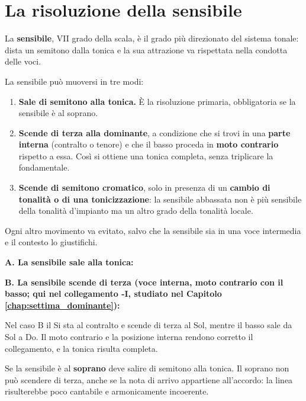 \section{La risoluzione della sensibile}
\label{sec:risoluzione_sensibile}

La \textbf{sensibile}, VII grado della scala, è il grado più direzionato del sistema tonale: dista un semitono dalla tonica e la sua attrazione va rispettata nella condotta delle voci.

\begin{regola}
	\label{reg:tre_movimenti_sensibile}
	La sensibile può muoversi in tre modi:
	\begin{enumerate}
		\item \textbf{Sale di semitono alla tonica.} È la risoluzione primaria, obbligatoria se la sensibile è al soprano.
		\item \textbf{Scende di terza alla dominante}, a condizione che si trovi in una \textbf{parte interna} (contralto o tenore) e che il basso proceda in \textbf{moto contrario} rispetto a essa. Così si ottiene una tonica completa, senza triplicare la fondamentale.
		\item \textbf{Scende di semitono cromatico}, solo in presenza di un \textbf{cambio di tonalità o di una tonicizzazione}: la sensibile abbassata non è più sensibile della tonalità d'impianto ma un altro grado della tonalità locale.
	\end{enumerate}
	Ogni altro movimento va evitato, salvo che la sensibile sia in una voce intermedia e il contesto lo giustifichi.
\end{regola}

\begin{esempio}
	\label{ex:risoluzioni_sensibile}

	\textbf{A. La sensibile sale alla tonica:}

	\vspace{0.5cm}
	\textbf{B. La sensibile scende di terza (voce interna, moto contrario con il basso; qui nel collegamento -I, studiato nel Capitolo \ref{chap:settima_dominante}):}

	Nel caso B il Si sta al contralto e scende di terza al Sol, mentre il basso sale da Sol a Do. Il moto contrario e la posizione interna rendono corretto il collegamento, e la tonica risulta completa.
\end{esempio}

\begin{errore}
	\label{err:sensibile_non_risolta}
	Se la sensibile è al \textbf{soprano} deve salire di semitono alla tonica. Il soprano non può scendere di terza, anche se la nota di arrivo appartiene all'accordo: la linea risulterebbe poco cantabile e armonicamente incoerente.
\end{errore}
